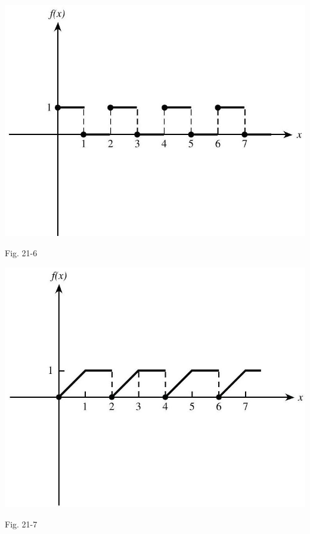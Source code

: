 \documentclass[10pt]{article}
\begin{document}
\begin{center}
\includegraphics[max width=\textwidth]{2024_04_03_5bb5b4275a64cb9887d1g-241(2)}
\end{center}

Fig. 21-6

\begin{center}
\includegraphics[max width=\textwidth]{2024_04_03_5bb5b4275a64cb9887d1g-241}
\end{center}

Fig. 21-7
\end{document}
